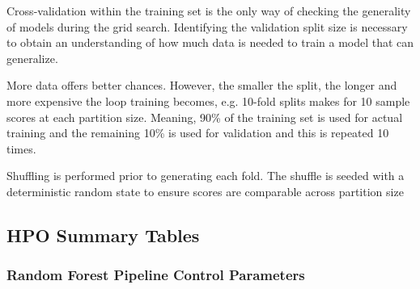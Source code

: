 \documentclass[aip, jmp, amsmath, amssymb, nofootinbib]{revtex4-2}
\begin{document}
Cross-validation within the training set is the only way of checking
the generality of models during the grid search. Identifying the
validation split size is necessary to obtain an understanding of how
much data is needed to train a model that can generalize.

More data offers better chances. However, the smaller the split, the
longer and more expensive the loop training becomes, e.g. 10-fold
splits makes for 10 sample scores at each partition size. Meaning, 90\%
of the training set is used for actual training and the remaining 10\%
is used for validation and this is repeated 10 times.

Shuffling is performed prior to generating each fold. The shuffle is
seeded with a deterministic random state to ensure scores are
comparable across partition size

\subsection*{HPO Summary Tables}
\label{sec:orgbfe97e6}
\subsubsection*{Random Forest Pipeline Control Parameters}
\label{sec:org6df071c}
\end{document}
